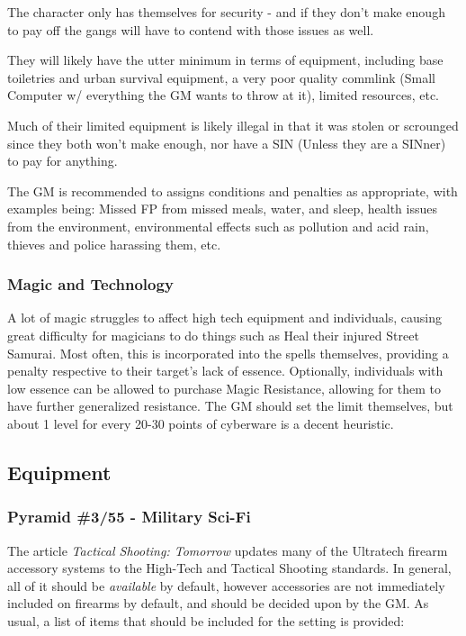 \begin{multicols}{2}
\begin{coloredbox}
	The character only has themselves for security - and if they don't make enough to pay off the gangs will have to contend with those issues as well. 
	
	They will likely have the utter minimum in terms of equipment, including base toiletries and urban survival equipment, a very poor quality commlink (Small Computer w/ everything the GM wants to throw at it), limited resources, etc. 
	
	Much of their limited equipment is likely illegal in that it was stolen or scrounged since they both won't make enough, nor have a SIN (Unless they are a SINner) to pay for anything.
	
	The GM is recommended to assigns conditions and penalties as appropriate, with examples being: Missed FP from missed meals, water, and sleep, health issues from the environment, environmental effects such as pollution and acid rain, thieves and police harassing them, etc. \\
	
\end{coloredbox}
	\newpage %
	\subsubsection{Magic and Technology}
	
	A lot of magic struggles to affect high tech equipment and individuals, causing great difficulty for magicians to do things such as Heal their injured Street Samurai. Most often, this is incorporated into the spells themselves, providing a penalty respective to their target's lack of essence. Optionally, individuals with low essence can be allowed to purchase Magic Resistance, allowing for them to have further generalized resistance. The GM should set the limit themselves, but about 1 level for every 20-30 points of cyberware is a decent heuristic.
	
	\subsection{Equipment}\label{setting_equipment}
	
	\subsubsection{\GURPS Pyramid \#3/55 - Military Sci-Fi}\label{3/55}
	
	The article \textit{Tactical Shooting: Tomorrow} updates many of the Ultratech firearm accessory systems to the High-Tech and Tactical Shooting standards. In general, all of it should be \textit{available} by default, however accessories are not immediately included on firearms by default, and should be decided upon by the GM. As usual, a list of items that should be included for the setting is provided:
	

\end{multicols}
